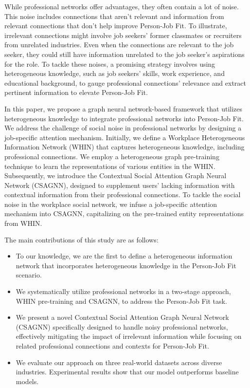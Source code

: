 While professional networks offer advantages, they often contain a lot of noise. This noise includes connections that aren't relevant and information from relevant connections that don't help improve Person-Job Fit. To illustrate, irrelevant connections might involve job seekers' former classmates or recruiters from unrelated industries. Even when the connections are relevant to the job seeker, they could still have information unrelated to the job seeker's aspirations for the role. To tackle these noises, a promising strategy involves using heterogeneous knowledge, such as job seekers' skills, work experience, and educational background, to gauge professional connections' relevance and extract pertinent information to elevate Person-Job Fit.

In this paper, we propose a graph neural network-based framework that utilizes heterogeneous knowledge to integrate professional networks into Person-Job Fit. We address the challenge of social noise in professional networks by designing a job-specific attention mechanism. Initially, we define a Workplace Heterogeneous Information Network (WHIN) that captures heterogeneous knowledge, including professional connections. We employ a heterogeneous graph pre-training technique to learn the representations of various entities in the WHIN. Subsequently, we introduce the Contextual Social Attention Graph Neural Network (CSAGNN), designed to supplement users' lacking information with contextual information from their professional connections. To tackle the social noise in the workplace social network, we infuse a job-specific attention mechanism into CSAGNN, capitalizing on the pre-trained entity representations from WHIN.

The main contributions of this study are as follows:
\begin{itemize}
    \item To our knowledge, we are the first to define a heterogeneous information network that incorporates heterogeneous knowledge in the Person-Job Fit scenario.
    
    \item We systematically utilize professional networks in a two-stage approach, WHIN pre-training and CSAGNN, to address the Person-Job Fit task.
    
    \item We present a novel Contextual Social Attention Graph Neural Network (CSAGNN) specifically designed to handle noisy professional networks, effectively mitigating the impact of irrelevant information while focusing on related professional connections and contexts for Person-Job Fit.
    
    \item We evaluate our approach on three real-world datasets across diverse industries. Experimental results show that our model outperforms baseline models.
\end{itemize}
